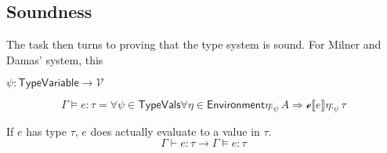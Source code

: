 


\subsection{Soundness}

The task then turns to proving that the type system is sound. For
Milner and Damas' system, this

$\psi : \mathsf{Type Variable} \rightarrow \mathcal{V}$

\[ \Gamma \vDash e : \tau = \forall \psi \in \mathsf{Type Vals} \forall \eta \in \mathsf{Environment} \eta
  :_\psi A \Rightarrow \mathcal{e} \llbracket e \rrbracket\eta :_\psi \tau  \]

If $e$ has type $\tau$, $e$ does actually evaluate to a value in $\tau$.
\[ \Gamma \vdash e : \tau \rightarrow \Gamma \vDash e : \tau \]



